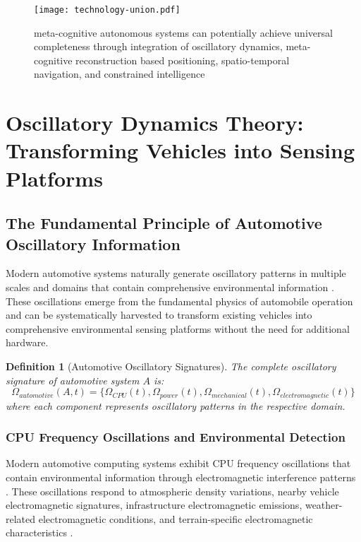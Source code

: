 \documentclass[12pt,a4paper]{article}
\newtheorem{definition}[theorem]{Definition}
\begin{document}
\begin{figure}[H]
\centering
\texttt{[image: technology-union.pdf]}
\caption{meta-cognitive autonomous systems can potentially  achieve universal completeness through integration of oscillatory dynamics, meta-cognitive reconstruction based positioning, spatio-temporal navigation, and constrained intelligence}
\label{fig:technology-union}
\end{figure}

\section{Oscillatory Dynamics Theory: Transforming Vehicles into Sensing Platforms}

\subsection{The Fundamental Principle of Automotive Oscillatory Information}

Modern automotive systems naturally generate oscillatory patterns in multiple scales and domains that contain comprehensive environmental information \cite{strogatz2014,pikovsky2001}. These oscillations emerge from the fundamental physics of automobile operation \cite{gillespie1992,rajamani2011} and can be systematically harvested to transform existing vehicles into comprehensive environmental sensing platforms without the need for additional hardware.

\begin{definition}[Automotive Oscillatory Signatures]
The complete oscillatory signature of automotive system $A$ is:
\begin{equation}
\Omega_{automotive}(A,t) = \{
    \Omega_{CPU}(t), \Omega_{power}(t), \Omega_{mechanical}(t), \Omega_{electromagnetic}(t)
\}
\end{equation}
where each component represents oscillatory patterns in the respective domain.
\end{definition}

\subsubsection{CPU Frequency Oscillations and Environmental Detection}

Modern automotive computing systems exhibit CPU frequency oscillations that contain environmental information through electromagnetic interference patterns \cite{paul2006,ott2009}. These oscillations respond to atmospheric density variations, nearby vehicle electromagnetic signatures, infrastructure electromagnetic emissions, weather-related electromagnetic conditions, and terrain-specific electromagnetic characteristics \cite{kraus1999,balanis2005}.
\end{document}
